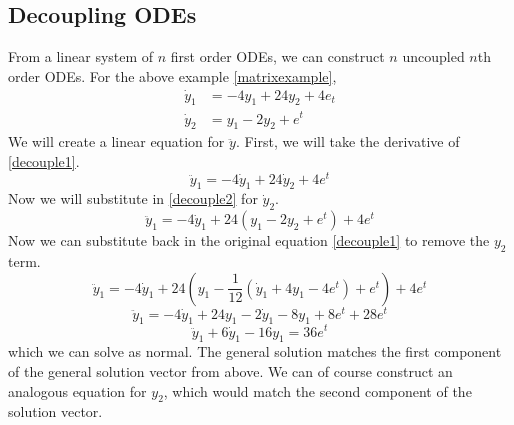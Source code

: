 \documentclass{article}
\begin{document}
	\subsection{Decoupling ODEs}
	From a linear system of $n$ first order ODEs, we can construct $n$ uncoupled $n$th order ODEs. For the above example \eqref{matrixexample},
	\begin{align}
		\label{decouple1} \dot y_1 &= -4y_1 + 24y_2 + 4e_t \\
		\label{decouple2} \dot y_2 &= y_1 - 2y_2 + e^t
	\end{align}
	We will create a linear equation for $\ddot y$. First, we will take the derivative of \eqref{decouple1}.
	\[ \ddot y_1 = -4\dot y_1 + 24\dot y_2 + 4e^t \]
	Now we will substitute in \eqref{decouple2} for $\dot y_2$.
	\[ \ddot y_1 = -4\dot y_1 + 24(y_1 - 2y_2 + e^t) + 4e^t \]
	Now we can substitute back in the original equation \eqref{decouple1} to remove the $y_2$ term.
	\[ \ddot y_1 = -4\dot y_1 + 24\left(y_1 - \frac{1}{12}(\dot y_1 + 4y_1 - 4e^t) + e^t\right) + 4e^t \]
	\[ \ddot y_1 = -4\dot y_1 + 24y_1 - 2\dot y_1 - 8y_1 + 8e^t + 28e^t \]
	\[ \ddot y_1 + 6\dot y_1 - 16y_1 = 36e^t \]
	which we can solve as normal. The general solution matches the first component of the general solution vector from above. We can of course construct an analogous equation for $y_2$, which would match the second component of the solution vector.
\end{document}
